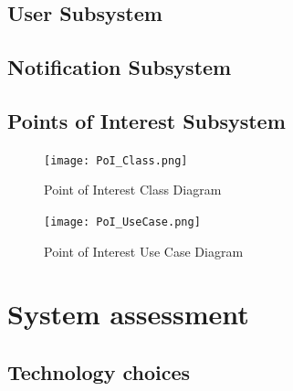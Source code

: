 \documentclass{article}
\begin{document}
			    
			\subsection{User Subsystem}\label{subsec:users}
			\subsection{Notification Subsystem}\label{subsec:notification}

			\newpage
			\subsection{Points of Interest Subsystem}\label{subsec:points of interest}
				\begin{figure}[H]
		 \texttt{[image: PoI\_Class.png]}
                     \caption{Point of Interest Class Diagram}
					 \label{fig:PoI_class}
			    \end{figure}

			\begin{figure}[H]
		 \texttt{[image: PoI\_UseCase.png]}
                     \caption{Point of Interest Use Case Diagram}
					 \label{fig:PoI_UseCase}
			    \end{figure}

		\newpage

		\section{System assessment}\label{sec:assessment }	
			\subsection{Technology choices}\label{subsec:tech choices}
			
\end{document}
